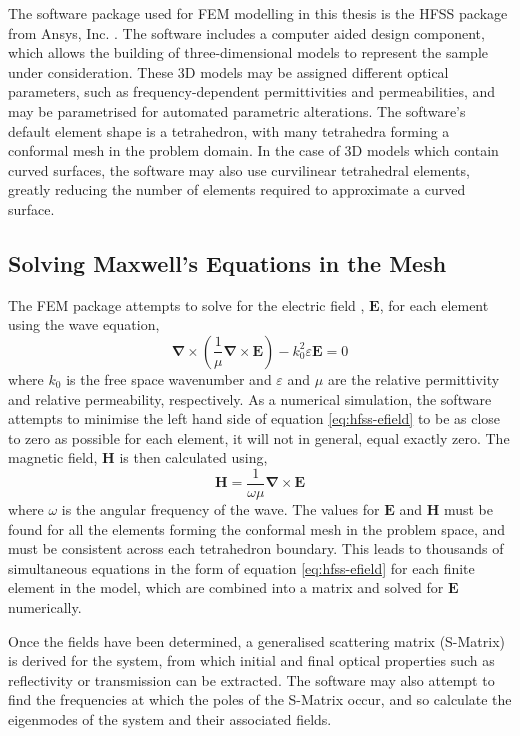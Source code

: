 The software package used for FEM modelling in this thesis is the HFSS package from Ansys, Inc. \cite{Ansys2012}. The software includes a computer aided design component, which allows the building of three-dimensional models  to represent the sample under consideration. These 3D models may be assigned different optical parameters, such as frequency-dependent permittivities and permeabilities, and may be parametrised for automated parametric alterations. The software's default element shape is a tetrahedron, with many tetrahedra forming a conformal mesh in the problem domain. In the case of 3D models which contain curved surfaces, the software may also use curvilinear tetrahedral elements, greatly reducing the number of elements required to approximate a curved surface.

\subsection{Solving Maxwell's Equations in the Mesh}
The FEM package attempts to solve for the electric field \cite{Kopp2009}, $\mathbf{E}$, for each element using the wave equation,
\begin{equation}
	\mathbf{\nabla} \times \left( \frac{1}{\mu} \mathbf{\nabla} \times 	\mathbf{E} \right) -k_0^2 \varepsilon \mathbf{E} = 0
	\label{eq:hfss-efield}
\end{equation}
where $k_0$ is the free space wavenumber and $\varepsilon$ and $\mu$ are the relative permittivity and relative permeability, respectively. As a numerical simulation, the software attempts to minimise the left hand side of equation \ref{eq:hfss-efield} to be as close to zero as possible for each element, it will not in general, equal exactly zero. The magnetic field, $\mathbf{H}$ is then calculated using,
\begin{equation}
	\mathbf{H}=\frac{1}{\omega \mu} \mathbf{\nabla} \times \mathbf{E}
\end{equation}
where $\omega$ is the angular frequency of the wave. The values for $\mathbf{E}$ and $\mathbf{H}$ must be found for all the elements forming the conformal mesh in the problem space, and must be consistent across each tetrahedron boundary. This leads to thousands of simultaneous equations in the form of equation \ref{eq:hfss-efield} for each finite element in the model, which are combined into a matrix and solved for $\mathbf{E}$ numerically.

Once the fields have been determined, a generalised scattering matrix (S-Matrix) is derived for the system, from which initial and final optical properties such as reflectivity or transmission can be extracted. The software may also attempt to find the frequencies at which the poles of the S-Matrix occur, and so calculate the eigenmodes of the system and their associated fields.


